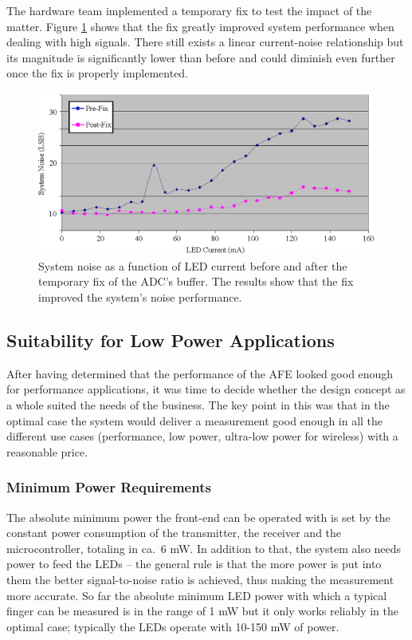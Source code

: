 The hardware team implemented a temporary fix to test the impact of the matter. Figure \ref{fig:noise_vs_current_post_fix} shows that the fix greatly improved system performance when dealing with high signals. There still exists a linear current-noise relationship but its magnitude is significantly lower than before and could diminish even further once the fix is properly implemented.

\begin{figure}[htcb]
\includegraphics{kuvat/measurements/noise_vs_current_post_fix.eps}
\caption{System noise as a function of LED current before and after the temporary fix of the ADC's buffer. The results show that the fix improved the system's noise performance.}
\label{fig:noise_vs_current_post_fix}
\end{figure}

\subsection{Suitability for Low Power Applications}

After having determined that the performance of the AFE looked good enough for performance applications, it was time to decide whether the design concept as a whole suited the needs of the business. The key point in this was that in the optimal case the system would deliver a measurement good enough in all the different use cases (performance, low power, ultra-low power for wireless) with a reasonable price.


\subsubsection{Minimum Power Requirements}

The absolute minimum power the front-end can be operated with is set by the constant power consumption of the transmitter, the receiver and the microcontroller, totaling in ca.\ 6 mW. In addition to that, the system also needs power to feed the LEDs -- the general rule is that the more power is put into them the better signal-to-noise ratio is achieved, thus making the measurement more accurate. So far the absolute minimum LED power with which a typical finger can be measured is in the range of 1 mW but it only works reliably in the optimal case; typically the LEDs operate with 10-150 mW of power.

